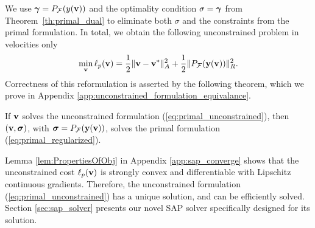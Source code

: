 We use ${\bm\gamma} = P_{\mathcal{F}}(y({\mathbf{v}}))$  and the optimality condition
$\sigma = {\bm\gamma}$ from Theorem~\ref{th:primal_dual} to eliminate both $\sigma$
and the constraints from the primal formulation. In total, we obtain the
following unconstrained problem in velocities only
\begin{eqnarray}
	\min_{\mf{v}} \ell_p(\mf{v}) = \frac{1}{2}\Vert\mf{v}-\mf{v}^*\Vert_{A}^2 +
	\frac{1}{2}\Vert P_\mathcal{F}(\mf{y}(\mf{v}))\Vert_R^2.
	\label{eq:primal_unconstrained}
\end{eqnarray}
Correctness of this reformulation is asserted by the following theorem, which we
prove in Appendix \ref{app:unconstrained_formulation_equivalance}.
\begin{theorem}
  If  ${\mathbf{v}}$ solves the unconstrained formulation
    (\ref{eq:primal_unconstrained}), then $({\mathbf{v}}, {\bm\sigma})$, with ${\bm\sigma}
    =P_\mathcal{F}({\mathbf{y}}({\mathbf{v}}))$, solves the primal formulation
    (\ref{eq:primal_regularized}).
    \label{th:unconstrained_formulation_equivalance}
\end{theorem}
Lemma \ref{lem:PropertiesOfObj} in Appendix \ref{app:sap_converge} shows that
the unconstrained cost $\ell_p({\mathbf{v}})$ is strongly convex and differentiable
with Lipschitz continuous gradients. Therefore, the unconstrained formulation
(\ref{eq:primal_unconstrained}) has a unique solution, and can be efficiently
solved.  
Section \ref{sec:sap_solver} presents our novel SAP solver specifically designed
for its solution.
